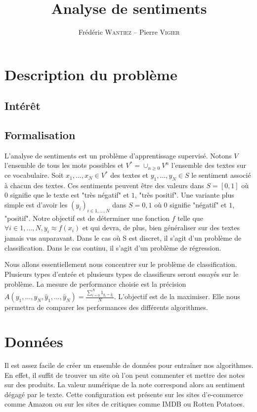 \documentclass{article}
\title{Analyse de sentiments}
\author{Frédéric \textsc{Wantiez} -- Pierre \textsc{Vigier}}
\begin{document}
\maketitle

\section{Description du problème}

\subsection{Intérêt}

\subsection{Formalisation}

L'analyse de sentiments est un problème d'apprentissage supervisé. Notons $V$ l'ensemble de tous les mots possibles et $V^{*}=\cup_{n \geq 0}{V^{n}}$ l'ensemble des textes sur ce vocabulaire. Soit $x_{1}, ..., x_{N} \in V^{*}$ des textes et $y_{1}, ..., y_{N} \in S$ le sentiment associé à chacun des textes. Ces sentiments peuvent être des valeurs dans $S=[0, 1]$ où $0$ signifie que le texte est "très négatif" et $1$, "très positif". Une variante plus simple est d'avoir les $(y_{i})_{i \in {1, ..., N}}$ dans $S={0, 1}$ où 0 signifie "négatif" et $1$, "positif". Notre objectif est de déterminer une fonction $f$ telle que $\forall i \in {1, ..., N}, y_{i} \approx f(x_{i})$ et qui devra, de plus, bien généraliser sur des textes jamais vus auparavant. Dans le cas où S est discret, il s'agit d'un problème de classification. Dans le cas continu, il s'agit d'un problème de régression.

Nous allons essentiellement nous concentrer sur le problème de classification. Plusieurs types d'entrée et plusieurs types de classifieurs seront essayés sur le problème. La mesure de performance choisie est la précision $A(y_{1}, ..., y_{N}, \hat{y}_{1}, ..., \hat{y}_{N}) = \frac{\sum_{i=0}^{N}{1_{y_{i}=\hat{y}_{i}}}}{N}$. L'objectif est de la maximiser. Elle nous permettra de comparer les performances des différents algorithmes.

\section{Données}

Il est assez facile de créer un ensemble de données pour entraîner nos algorithmes. En effet, il suffit de trouver un site où l'on peut commenter et mettre des notes sur des produits. La valeur numérique de la note correspond alors au sentiment dégagé par le texte. Cette configuration est présente sur les sites d'e-commerce comme Amazon ou sur les sites de critiques comme IMDB ou Rotten Potatoes.
\end{document}
